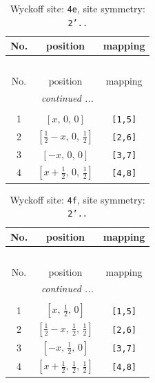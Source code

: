 \documentclass[fleqn,8pt]{jsarticle}
\begin{document}
\begin{longtable}{ccc}
\caption{Wyckoff site: {\tt 4e}, site symmetry: {\tt 2'..}}
 \\
 \hline \hline
No. & position & mapping \\ \hline \endfirsthead

\multicolumn{2}{l}{\tablename\ \thetable{}} \\
 \hline \hline
No. & position & mapping \\ \hline \endhead

 \hline \hline
\multicolumn{2}{r}{\footnotesize\it continued ...} \\ \endfoot

 \hline \hline
\multicolumn{2}{r}{} \\ \endlastfoot

1 & $\left[ x,\, 0,\, 0 \right]$ & {\tt [1,5]} \\ \hline
2 & $\left[ \frac{1}{2} - x,\, 0,\, \frac{1}{2} \right]$ & {\tt [2,6]} \\ \hline
3 & $\left[ - x,\, 0,\, 0 \right]$ & {\tt [3,7]} \\ \hline
4 & $\left[ x + \frac{1}{2},\, 0,\, \frac{1}{2} \right]$ & {\tt [4,8]} \\
\end{longtable}
\renewcommand{\arraystretch}{1.2}
\begin{longtable}{ccc}
\caption{Wyckoff site: {\tt 4f}, site symmetry: {\tt 2'..}}
 \\
 \hline \hline
No. & position & mapping \\ \hline \endfirsthead

\multicolumn{2}{l}{\tablename\ \thetable{}} \\
 \hline \hline
No. & position & mapping \\ \hline \endhead

 \hline \hline
\multicolumn{2}{r}{\footnotesize\it continued ...} \\ \endfoot

 \hline \hline
\multicolumn{2}{r}{} \\ \endlastfoot

1 & $\left[ x,\, \frac{1}{2},\, 0 \right]$ & {\tt [1,5]} \\ \hline
2 & $\left[ \frac{1}{2} - x,\, \frac{1}{2},\, \frac{1}{2} \right]$ & {\tt [2,6]} \\ \hline
3 & $\left[ - x,\, \frac{1}{2},\, 0 \right]$ & {\tt [3,7]} \\ \hline
4 & $\left[ x + \frac{1}{2},\, \frac{1}{2},\, \frac{1}{2} \right]$ & {\tt [4,8]} \\
\end{longtable}
\end{document}
